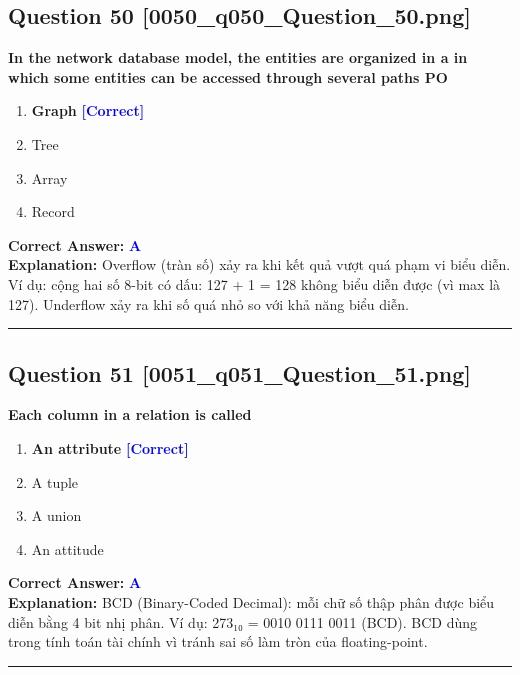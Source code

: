 \documentclass[11pt,a4paper]{article}
\begin{document}
\begin{minipage}{\textwidth}
\subsection*{Question 50 \quad \footnotesize{[0050\_q050\_Question\_50.png]}}
\noindent \textbf{In the network database model, the entities are organized in a in which some entities can be accessed through several paths PO}

\begin{enumerate}[label=\Alph*.]
    \item \textbf{Graph} \hfill \textcolor{blue}{\textbf{[Correct]}}
    \item Tree
    \item Array
    \item Record
\end{enumerate}

\noindent \textbf{Correct Answer:} \textcolor{blue}{\textbf{A}} \\[2pt]
\noindent \textbf{Explanation:} Overflow (tràn số) xảy ra khi kết quả vượt quá phạm vi biểu diễn. Ví dụ: cộng hai số 8-bit có dấu: 127 + 1 = 128 không biểu diễn được (vì max là 127). Underflow xảy ra khi số quá nhỏ so với khả năng biểu diễn.

\par\vspace{0.3cm}
\hrule
\vspace{0.3cm}
\end{minipage}

\begin{minipage}{\textwidth}
\subsection*{Question 51 \quad \footnotesize{[0051\_q051\_Question\_51.png]}}
\noindent \textbf{Each column in a relation is called}

\begin{enumerate}[label=\Alph*.]
    \item \textbf{An attribute} \hfill \textcolor{blue}{\textbf{[Correct]}}
    \item A tuple
    \item A union
    \item An attitude
\end{enumerate}

\noindent \textbf{Correct Answer:} \textcolor{blue}{\textbf{A}} \\[2pt]
\noindent \textbf{Explanation:} BCD (Binary-Coded Decimal): mỗi chữ số thập phân được biểu diễn bằng 4 bit nhị phân. Ví dụ: 273₁₀ = 0010 0111 0011 (BCD). BCD dùng trong tính toán tài chính vì tránh sai số làm tròn của floating-point.

\par\vspace{0.3cm}
\hrule
\vspace{0.3cm}
\end{minipage}
\end{document}

